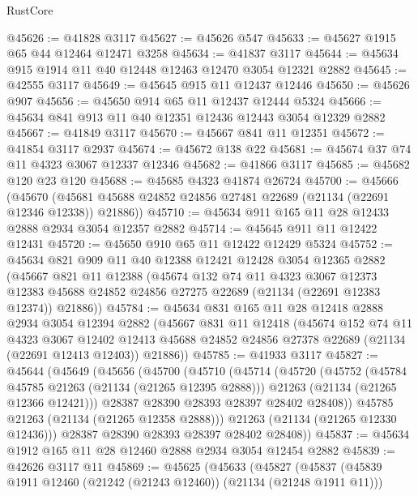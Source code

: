 \begin{lexlean}{RustCore}
\begin{coremodule}
@45626 := @41828 @3117
@45627 := @45626 @547
@45633 := @45627 @1915 @65 @44 @12464 @12471 @3258
@45634 := @41837 @3117
@45644 := @45634 @915 @1914 @11 @40 @12448 @12463 @12470 @3054 @12321 @2882
@45645 := @42555 @3117
@45649 := @45645 @915 @11 @12437 @12446
@45650 := @45626 @907
@45656 := @45650 @914 @65 @11 @12437 @12444 @5324
@45666 := @45634 @841 @913 @11 @40 @12351 @12436 @12443 @3054 @12329 @2882
@45667 := @41849 @3117
@45670 := @45667 @841 @11 @12351
@45672 := @41854 @3117 @2937
@45674 := @45672 @138 @22
@45681 := @45674 @37 @74 @11 @4323 @3067 @12337 @12346
@45682 := @41866 @3117
@45685 := @45682 @120 @23 @120
@45688 := @45685 @4323 @41874 @26724
@45700 := @45666
    (@45670 (@45681 @45688 @24852 @24856 @27481 @22689 (@21134 (@22691 @12346 @12338)) @21886))
@45710 := @45634 @911 @165 @11 @28 @12433 @2888 @2934 @3054 @12357 @2882
@45714 := @45645 @911 @11 @12422 @12431
@45720 := @45650 @910 @65 @11 @12422 @12429 @5324
@45752 := @45634
    @821
    @909
    @11
    @40
    @12388
    @12421
    @12428
    @3054
    @12365
    @2882
    (@45667
      @821
      @11
      @12388
      (@45674
        @132
        @74
        @11
        @4323
        @3067
        @12373
        @12383
        @45688
        @24852
        @24856
        @27275
        @22689
        (@21134 (@22691 @12383 @12374))
        @21886))
@45784 := @45634
    @831
    @165
    @11
    @28
    @12418
    @2888
    @2934
    @3054
    @12394
    @2882
    (@45667
      @831
      @11
      @12418
      (@45674
        @152
        @74
        @11
        @4323
        @3067
        @12402
        @12413
        @45688
        @24852
        @24856
        @27378
        @22689
        (@21134 (@22691 @12413 @12403))
        @21886))
@45785 := @41933 @3117
@45827 := @45644
    (@45649
      (@45656
        (@45700
          (@45710
            (@45714
              (@45720
                (@45752
                  (@45784 @45785 @21263 (@21134 (@21265 @12395 @2888)))
                  @21263
                  (@21134 (@21265 @12366 @12421)))
                @28387
                @28390
                @28393
                @28397
                @28402
                @28408))
            @45785
            @21263
            (@21134 (@21265 @12358 @2888)))
          @21263
          (@21134 (@21265 @12330 @12436)))
        @28387
        @28390
        @28393
        @28397
        @28402
        @28408))
@45837 := @45634 @1912 @165 @11 @28 @12460 @2888 @2934 @3054 @12454 @2882
@45839 := @42626 @3117 @11
@45869 := @45625
    (@45633
      (@45827
        (@45837
          (@45839 @1911 @12460 (@21242 (@21243 @12460)) (@21134 (@21248 @1911 @11)))

\end{coremodule}
\end{lexlean}
